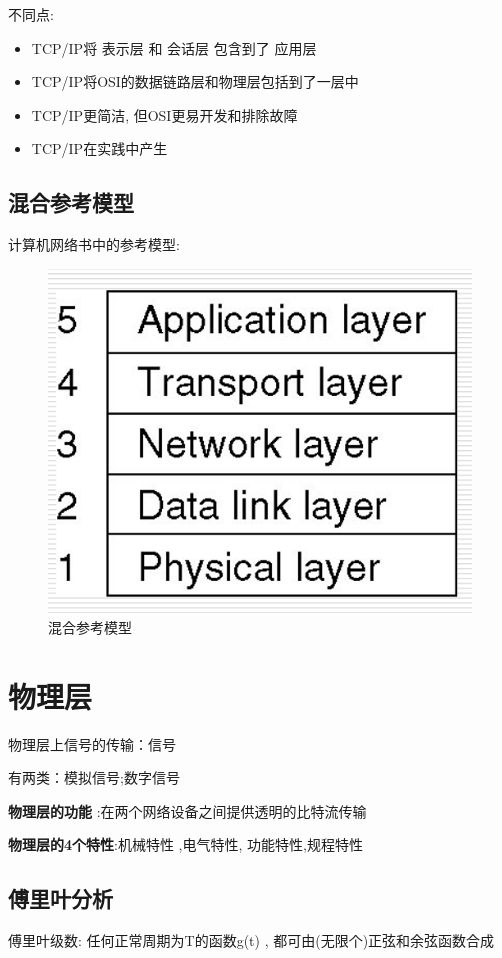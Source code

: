 \documentclass[UTF8,a4paper]{ctexart}
\begin{document}
  不同点:
  \begin{itemize}
    \item TCP/IP将 表示层 和 会话层 包含到了 应用层
    \item TCP/IP将OSI的数据链路层和物理层包括到了一层中
    \item TCP/IP更简洁, 但OSI更易开发和排除故障
    \item TCP/IP在实践中产生
  \end{itemize}

  \subsection{混合参考模型}
  计算机网络书中的参考模型:
  \begin{figure}[H]
    \centering
    \includegraphics[scale = 0.3]{assets/jisuanjiwangluo_39666.png}
    \caption{混合参考模型}
  \end{figure}

  \section{物理层}
  物理层上信号的传输：信号

  有两类：模拟信号;数字信号

  \textbf{物理层的功能} :在两个网络设备之间提供透明的比特流传输

  \textbf{物理层的4个特性}:机械特性 ,电气特性, 功能特性,规程特性

  \subsection{傅里叶分析}
  傅里叶级数: 任何正常周期为T的函数g(t) , 都可由(无限个)正弦和余弦函数合成
\end{document}
